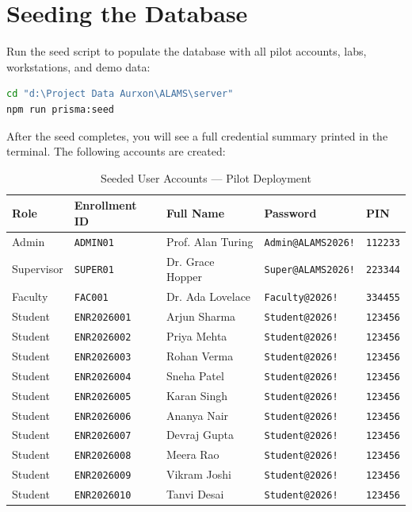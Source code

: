 \section{Seeding the Database}

Run the seed script to populate the database with all pilot accounts, labs, workstations, and demo data:

\begin{tcolorbox}[codebox, title={Run Database Seed}]
\begin{lstlisting}[language=bash]
cd "d:\Project Data Aurxon\ALAMS\server"
npm run prisma:seed
\end{lstlisting}
\end{tcolorbox}

After the seed completes, you will see a full credential summary printed in the terminal. The following accounts are created:

\begin{table}[h!]
\centering
\caption{Seeded User Accounts — Pilot Deployment}
\label{tab:credentials}
\begin{tabularx}{\textwidth}{llXll}
\toprule
\textbf{Role} & \textbf{Enrollment ID} & \textbf{Full Name} & \textbf{Password} & \textbf{PIN}\\
\midrule
\rowcolor{aurxonlightgray}
Admin & \texttt{ADMIN01} & Prof. Alan Turing & \texttt{Admin@ALAMS2026!} & \texttt{112233}\\
Supervisor & \texttt{SUPER01} & Dr. Grace Hopper & \texttt{Super@ALAMS2026!} & \texttt{223344}\\
\rowcolor{aurxonlightgray}
Faculty & \texttt{FAC001} & Dr. Ada Lovelace & \texttt{Faculty@2026!} & \texttt{334455}\\
\midrule
Student & \texttt{ENR2026001} & Arjun Sharma & \texttt{Student@2026!} & \texttt{123456}\\
\rowcolor{aurxonlightgray}
Student & \texttt{ENR2026002} & Priya Mehta & \texttt{Student@2026!} & \texttt{123456}\\
Student & \texttt{ENR2026003} & Rohan Verma & \texttt{Student@2026!} & \texttt{123456}\\
\rowcolor{aurxonlightgray}
Student & \texttt{ENR2026004} & Sneha Patel & \texttt{Student@2026!} & \texttt{123456}\\
Student & \texttt{ENR2026005} & Karan Singh & \texttt{Student@2026!} & \texttt{123456}\\
\rowcolor{aurxonlightgray}
Student & \texttt{ENR2026006} & Ananya Nair & \texttt{Student@2026!} & \texttt{123456}\\
Student & \texttt{ENR2026007} & Devraj Gupta & \texttt{Student@2026!} & \texttt{123456}\\
\rowcolor{aurxonlightgray}
Student & \texttt{ENR2026008} & Meera Rao & \texttt{Student@2026!} & \texttt{123456}\\
Student & \texttt{ENR2026009} & Vikram Joshi & \texttt{Student@2026!} & \texttt{123456}\\
\rowcolor{aurxonlightgray}
Student & \texttt{ENR2026010} & Tanvi Desai & \texttt{Student@2026!} & \texttt{123456}\\
\bottomrule
\end{tabularx}
\end{table}

